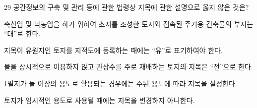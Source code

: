 \begin{question}{29}
공간정보의 구축 및 관리 등에 관한 법령상 지목에 관한 설명으로 옳지 않은 것은?
\begin{choices}
  \item 축산업 및 낙농업을 하기 위하여 초지를 조성한 토지와 접속된 주거용 건축물의 부지는 “대”로 한다.
  \item 지목이 유원지인 토지를 지적도에 등록하는 때에는 “유”로 표기하여야 한다.
  \item 물을 상시적으로 이용하지 않고 관상수를 주로 재배하는 토지의 지목은 “전”으로 한다.
  \item 1필지가 둘 이상의 용도로 활용되는 경우에는 주된 용도에 따라 지목을 설정한다.
  \item 토지가 임시적인 용도로 사용될 때에는 지목을 변경하지 아니한다.
\end{choices}
\end{question}
